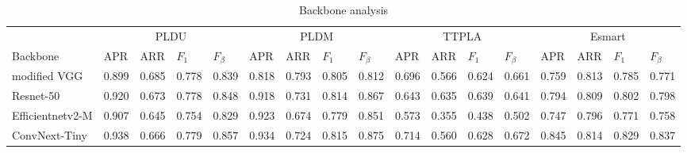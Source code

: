\documentclass[journal]{IEEEtran}
\begin{document}
\begin{table}[]
\begin{tabular}{lllll|llll|llll|llll}
                 & \multicolumn{4}{c|}{PLDU}           & \multicolumn{4}{c|}{PLDM}           & \multicolumn{4}{c|}{TTPLA}          & \multicolumn{4}{c}{Esmart}          \\ \cline{2-17} 
Backbone         & APR   & ARR   & $F_1$ & $F_{\beta}$ & APR   & ARR   & $F_1$ & $F_{\beta}$ & APR   & ARR   & $F_1$ & $F_{\beta}$ & APR   & ARR   & $F_1$ & $F_{\beta}$ \\ \hline
modified VGG     & 0.899 & 0.685 & 0.778 & 0.839       & 0.818 & 0.793 & 0.805 & 0.812       & 0.696 & 0.566 & 0.624 & 0.661       & 0.759 & 0.813 & 0.785 & 0.771       \\
Resnet-50        & 0.920 & 0.673 & 0.778 & 0.848       & 0.918 & 0.731 & 0.814 & 0.867       & 0.643 & 0.635 & 0.639 & 0.641       & 0.794 & 0.809 & 0.802 & 0.798       \\
Efficientnetv2-M & 0.907 & 0.645 & 0.754 & 0.829       & 0.923 & 0.674 & 0.779 & 0.851       & 0.573 & 0.355 & 0.438 & 0.502       & 0.747 & 0.796 & 0.771 & 0.758       \\
ConvNext-Tiny    & 0.938 & 0.666 & 0.779 & 0.857       & 0.934 & 0.724 & 0.815 & 0.875       & 0.714 & 0.560 & 0.628 & 0.672       & 0.845 & 0.814 & 0.829 & 0.837      
\end{tabular}
\caption{\label{backbone_res_table} Backbone analysis}
\end{table}
\end{document}
